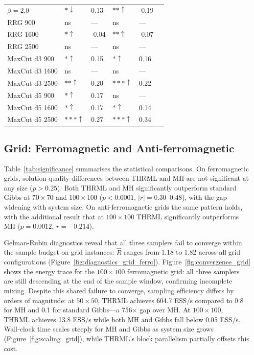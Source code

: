 \documentclass[conference]{IEEEtran}
\begin{document}
\begin{table}[h]
\begin{tabular}{llllll}
    $\beta=2.0$              & $*\downarrow$ & 0.13 & $**\uparrow$ & -0.19 \\
    RRG 900                  & ns     &  ---   & ns      &  ---  \\
    RRG 1600                 & $*\uparrow$  & -0.04 & $**\uparrow$ & -0.07 \\
    RRG 2500                 & ns     &  ---   & ns      &  ---  \\
    MaxCut d3 900            & $*\uparrow$  & 0.15  & $*\uparrow$  & 0.16  \\
    MaxCut d3 1600           & ns     &  ---   & ns      &  ---  \\
    MaxCut d3 2500           & $**\uparrow$ & 0.20  & $***\uparrow$ & 0.22 \\
    MaxCut d5 900            & $*\uparrow$  & 0.17  & ns      &  ---  \\
    MaxCut d5 1600           & $*\uparrow$  & 0.17  & $*\uparrow$  & 0.14  \\
    MaxCut d5 2500           & $***\uparrow$ & 0.27 & $***\uparrow$ & 0.34 \\
    \hline
  \end{tabular}
\end{table}

\subsection{Grid: Ferromagnetic and Anti-ferromagnetic}

Table~\ref{tab:significance} summarises the statistical comparisons. On ferromagnetic grids, solution quality differences between THRML and MH are not significant at any size ($p > 0.25$). Both THRML and MH significantly outperform standard Gibbs at $70{\times}70$ and $100{\times}100$ ($p < 0.0001$, $|r| = 0.30$--$0.48$), with the gap widening with system size. On anti-ferromagnetic grids the same pattern holds, with the additional result that at $100{\times}100$ THRML significantly outperforms MH ($p = 0.0012$, $r = -0.214$).

Gelman-Rubin diagnostics reveal that all three samplers fail to converge within the sample budget on grid instances: $\hat{R}$ ranges from 1.18 to 1.82 across all grid configurations (Figure~\ref{fig:diagnostics_grid_ferro}). Figure~\ref{fig:convergence_grid} shows the energy trace for the $100{\times}100$ ferromagnetic grid: all three samplers are still descending at the end of the sample window, confirming incomplete mixing. Despite this shared failure to converge, sampling efficiency differs by orders of magnitude: at $50{\times}50$, THRML achieves 604.7 ESS/s compared to 0.8 for MH and 0.1 for standard Gibbs---a 756$\times$ gap over MH. At $100{\times}100$, THRML achieves 13.8 ESS/s while both MH and Gibbs fall below 0.05 ESS/s. Wall-clock time scales steeply for MH and Gibbs as system size grows (Figure~\ref{fig:scaling_grid}), while THRML's block parallelism partially offsets this cost.
\end{document}

